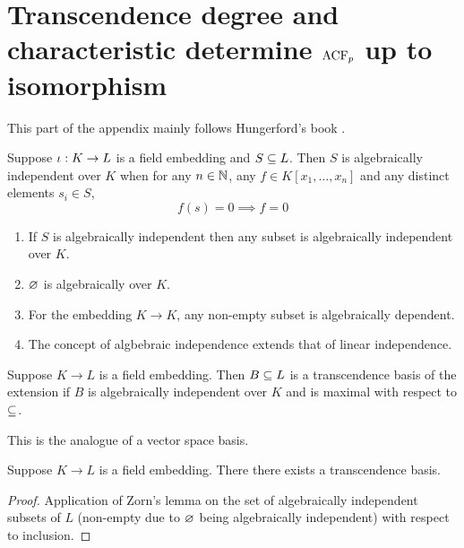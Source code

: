 \section{Transcendence degree and characteristic
determine \texorpdfstring{$\operatorname{ACF}_p$}{TEXT} up to isomorphism}
This part of the appendix mainly follows Hungerford's book \cite{hungerford}.
\begin{dfn}
    Suppose $\iota: K \to L$ is a field embedding
    and $S \subseteq L$.
    Then $S$ is algebraically independent over $K$
    when for any $n \in \mathbb{N}$, any $f \in K[x_1,\dots, x_n]$
    and any distinct elements $s_i \in S$, 
    \[f(s) = 0 \implies f = 0\]
\end{dfn}

\begin{rmk}
    \begin{enumerate}
        \item If $S$ is algebraically independent then any subset is 
        algebraically independent over $K$.
        \item $\varnothing$ is algebraically over $K$.
        \item For the embedding $K \to K$, any non-empty subset is
            algebraically dependent.
        \item The concept of algbebraic independence extends that of 
            linear independence.
    \end{enumerate}
\end{rmk}

\begin{dfn}
    Suppose $K \to L$ is a field embedding.
    Then $B \subseteq L$ is a transcendence basis of the extension
    if $B$ is algebraically independent over $K$ and is maximal
    with respect to $\subseteq$.
\end{dfn}
\begin{rmk}
    This is the analogue of a vector space basis.
\end{rmk}

\begin{prop}
    Suppose $K \to L$ is a field embedding.
    There there exists a transcendence basis.
\end{prop}
\begin{proof}
    Application of Zorn's lemma on the set of algebraically independent 
    subsets of $L$ (non-empty due to $\varnothing$ being algebraically independent)
    with respect to inclusion.
\end{proof}

